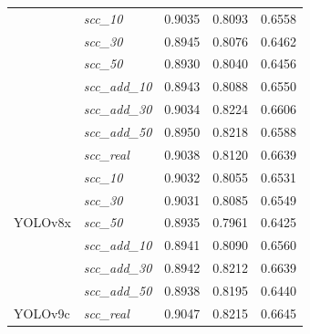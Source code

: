 \begin{table}[h!]
{\begin{tabular}{l|l|c|c|c}
                                      & \textit{scc\_10}        & 0.9035                     & 0.8093                     & 0.6558                     \\
                                      & \textit{scc\_30}        & 0.8945                     & 0.8076                     & 0.6462                     \\
                                      & \textit{scc\_50}        & 0.8930                     & 0.8040                     & 0.6456                     \\
                                      & \textit{scc\_add\_10}   & 0.8943                     & 0.8088                     & 0.6550                     \\
                                      & \textit{scc\_add\_30}   & 0.9034                     & \cellcolor{blue!10}0.8224  & 0.6606                     \\
                                      & \textit{scc\_add\_50}   & 0.8950                     & 0.8218                     & 0.6588                     \\
        \midrule
        \multirow[t]{7}{*}{YOLOv8x}   & \textit{scc\_real}      & \cellcolor{blue!10}0.9038  & 0.8120                     & \cellcolor{blue!10}0.6639  \\
                                      & \textit{scc\_10}        & 0.9032                     & 0.8055                     & 0.6531                     \\
                                      & \textit{scc\_30}        & 0.9031                     & 0.8085                     & 0.6549                     \\
                                      & \textit{scc\_50}        & 0.8935                     & 0.7961                     & 0.6425                     \\
                                      & \textit{scc\_add\_10}   & 0.8941                     & 0.8090                     & 0.6560                     \\
                                      & \textit{scc\_add\_30}   & 0.8942                     & \cellcolor{blue!10}0.8212  & \cellcolor{blue!10}0.6639  \\
                                      & \textit{scc\_add\_50}   & 0.8938                     & 0.8195                     & 0.6440                     \\
        \midrule
        \multirow[t]{7}{*}{YOLOv9c}   & \textit{scc\_real}      & \cellcolor{blue!10}0.9047  & 0.8215                     & \cellcolor{blue!10}0.6645  \\

\end{tabular}}
\end{table}
